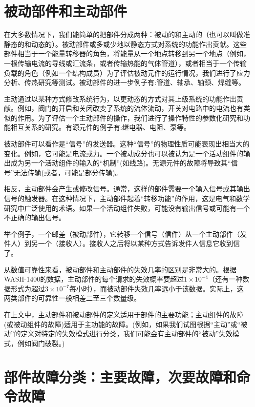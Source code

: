 \documentclass[cn,11pt,chinese]{elegantbook}
\begin{document}
\section{被动部件和主动部件}

在大多数情况下，我们能简单的把部件分成两种：被动的和主动的（也可以叫做准静态的和动态的）。被动部件或多或少地以静态方式对系统的功能作出贡献。这些部件相当于一个能量转移器的角色，将能量从一个地点转移到另一个地点（例如，一根传输电流的导线或汇流条，或者传输热能的气体管道），或者相当于一个传输负载的角色（例如一个结构成员）为了评估被动元件的运行情况，我们进行了应力分析、传热研究等测试。被动部件的进一步例子有:管道、轴承、轴颈、焊缝等。

主动通过以某种方式修改系统行为，以更动态的方式对其上级系统的功能作出贡献。例如，阀门的开启和关闭改变了系统的流体流动，开关对电路中的电流也有类似的作用。为了评估一个主动部件的操作，我们进行了操作特性的参数化研究和功能相互关系的研究。有源元件的例子有:继电器、电阻、泵等。

被动部件可以看作是“信号”的发送器。这种“信号”的物理性质可能表现出相当大的变化。例如，它可能是电流或力。一个被动成分也可以被认为是一个活动组件的输出成为另一个活动组件的输入的“机制”(如线路)。无源元件的故障将导致其“信号”无法传输(或者，可能是部分传输)。

相反，主动部件会产生或修改信号。通常，这样的部件需要一个输入信号或其输出信号的触发器。在这种情况下，主动部件起着“转移功能”的作用，这是电气和数学研究中广泛使用的术语。如果一个活动组件失败，可能没有输出信号或可能有一个不正确的输出信号。

举个例子，一个邮差（被动部件），它转移一个信号（信件）从一个主动部件（发件人）到另一个（接收人）。接收人之后将以某种方式告诉发件人信息它收到信了。

从数值可靠性来看，被动部件和主动部件的失效几率的区别是非常大的。根据WASH-1400的数据，主动部件的每个请求的失效概率要超过$1 \times 10^{-4}$（还有一种数据形式为超过$3 \times 10^{-7}$每小时），而被动部件失效几率远小于该数据。实际上，这两类部件的可靠性一般相差二至三个数量级。

在上文中，主动部件和被动部件的定义适用于部件的主要功能；主动组件的故障(或被动组件的故障)适用于主功能的故障。(例如，如果我们试图根据“主动”或“被动”的定义对特定的失效模式进行分类，我们可能会有主动部件的“被动”失效模式，例如阀门破裂。)

\section{部件故障分类：主要故障，次要故障和命令故障}
\end{document}
